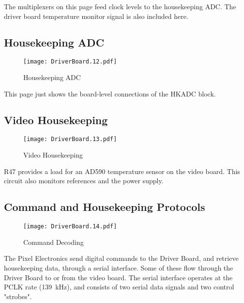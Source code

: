 \documentclass[a4paper,12pt]{article}
\begin{document}
The multiplexers on this page feed clock levels to the housekeeping ADC. The driver board temperature monitor signal is also included here.

\subsection{Housekeeping ADC}

   \begin{figure}
   \begin{center}
   \texttt{[image: DriverBoard.12.pdf]}
   \end{center}
   \caption{Housekeeping ADC}
   \end{figure}

This page just shows the board-level connections of the HKADC block.

\subsection{Video Housekeeping}

   \begin{figure}
   \begin{center}
   \texttt{[image: DriverBoard.13.pdf]}
   \end{center}
   \caption{Video Housekeeping}
   \end{figure}


R47 provides a load for an AD590 temperature sensor on the video board. This circuit also monitors references and the power supply.

\subsection{Command and Housekeeping Protocols}
   \begin{figure}
   \begin{center}
   \texttt{[image: DriverBoard.14.pdf]}
   \end{center}
   \caption{Command Decoding}
   \end{figure}

The Pixel Electronics send digital commands to the Driver Board, and retrieve housekeeping data, through a serial interface. Some of these flow through the Driver Board to or from the video board. The serial interface operates at the PCLK rate (139\ kHz), and consists of two serial data signals and two control "strobes".
\end{document}
